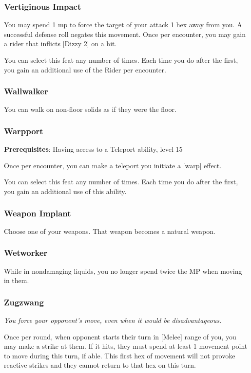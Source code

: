 \begin{multicols*}{2}
\subsubsection{Vertiginous Impact}
You may spend 1 mp to force the target of your attack 1 hex away from you. A successful defense roll negates this movement.
Once per encounter, you may gain a rider that inflicts [Dizzy 2] on a hit.

You can select this feat any number of times. Each time you do after the first, you gain an additional use of the Rider per encounter.

\subsubsection{Wallwalker}
You can walk on non-floor solids as if they were the floor.

\subsubsection{Warpport}
\textbf{Prerequisites}: Having access to a Teleport ability, level 15

Once per encounter, you can make a teleport you initiate a [warp] effect.

You can select this feat any number of times. Each time you do after the first, you gain an additional use of this ability.

\subsubsection{Weapon Implant}
Choose one of your weapons. That weapon becomes a natural weapon.

\subsubsection{Wetworker}
While in nondamaging liquids, you no longer spend twice the MP when moving in them.

\subsubsection{Zugzwang}
\emph{You force your opponent's move, even when it would be disadvantageous.}

Once per round, when opponent starts their turn in [Melee] range of you, you may make a strike at them. If it hits, they must spend at least 1 movement point to move during this turn, if able. This first hex of movement will not provoke reactive strikes and they cannot return to that hex on this turn.

\end{multicols*}